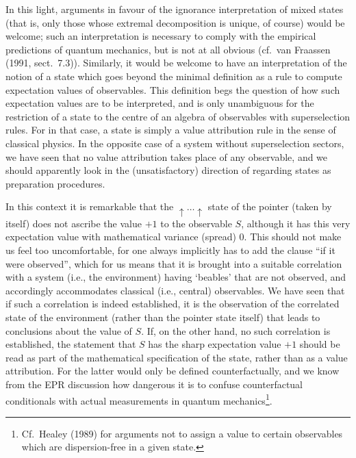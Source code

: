 \documentclass[12pt,titlepage]{article}
\newcommand{\fn}{\footnote}
\newcommand{\Up}{\uparrow\ldots\uparrow}
\begin{document}
In this light, arguments in favour of the ignorance interpretation of mixed
states (that is,
only those whose extremal decomposition is unique, of course) would be welcome;
such an interpretation
is necessary to comply with the empirical predictions of quantum mechanics, but
is not at all obvious
(cf.\ van Fraassen (1991, sect.\ 7.3)). Similarly, it would be welcome to have
an interpretation of
the notion of a state which goes beyond the minimal definition as a rule to
compute expectation
values of observables. This definition begs the question of how such
expectation values are to be
interpreted, and is only unambiguous for the restriction of a state to the
centre  of an algebra of
observables with superselection rules. For in that case, a state is simply a
value attribution rule
in the sense of classical physics. In the opposite case of a system without
superselection sectors,
we have seen that no value attribution takes place of any observable, and we
should apparently look
in the (unsatisfactory) direction of regarding states as preparation
procedures.

In this context it is remarkable that the $\Up$ state of the pointer (taken by
itself) does not
ascribe the value $+1$ to the observable $S$, although it has this very
expectation value with
mathematical variance (spread)  0.  This should not make us feel too
uncomfortable, for one always
implicitly has to add the clause ``if it were observed'', which for us means
that it is brought into
a suitable correlation with a system (i.e., the environment) having `beables'
that are not observed,
and accordingly accommodates  classical (i.e., central) observables. We have
seen that if such a
correlation is indeed established, it is the observation of the correlated
state of the environment
(rather than the pointer state itself) that leads to conclusions about the
value of $S$. If, on the
other hand, no such correlation is established, the statement that $S$ has the
sharp expectation
value $+1$ should be  read as part of the mathematical  specification of the
state, rather than as a
value attribution. For the latter would only be defined counterfactually, and
we know from the EPR
discussion how dangerous it is to confuse counterfactual conditionals with
actual measurements in
quantum mechanics\fn{Cf.\ Healey (1989) for arguments not to assign a value to
certain observables
which are dispersion-free in a given state.}.
\end{document}
